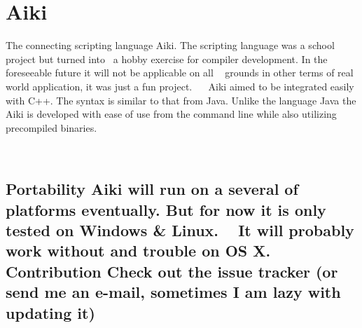 \section*{Aiki }

The connecting scripting language Aiki. The scripting language was a school project but turned into~\newline
 a hobby exercise for compiler development. In the foreseeable future it will not be applicable on all ~\newline
 grounds in other terms of real world application, it was just a fun project.~\newline
~\newline
 Aiki aimed to be integrated easily with C++. The syntax is similar to that from Java. Unlike the language Java the Aiki is developed with ease of use from the command line while also utilizing precompiled binaries.

~\newline
 ~\newline
 \subsection*{Portability  Aiki will run on a several of platforms eventually. But for now it is only tested on Windows \& Linux. ~\newline
 It will probably work without and trouble on O\+S X. ~\newline
 ~\newline
  Contribution  Check out the issue tracker (or send me an e-\/mail, sometimes I am lazy with updating it) }